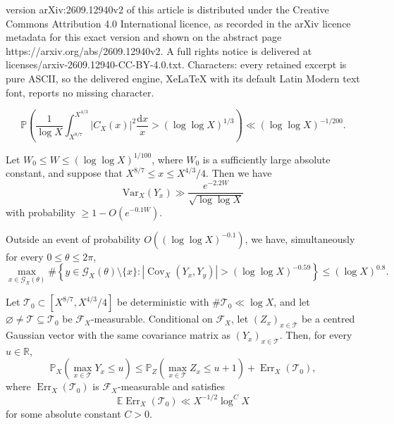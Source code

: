 \documentclass[10pt,a4paper]{amsart}
\newcommand{\E}{\mathbb{E}}
\newcommand{\R}{\mathbb{R}}
\newcommand{\cov}{\operatorname{Cov}}
\newcommand{\p}{\mathbb{P}}
\begin{document}
version arXiv:2609.12940v2 of this article is distributed under the Creative Commons Attribution 4.0 International licence, as recorded in the arXiv licence metadata for this exact version and shown on the abstract page https://arxiv.org/abs/2609.12940v2. A full rights notice is delivered at licenses/arxiv-2609.12940-CC-BY-4.0.txt. Characters: every retained excerpt is pure ASCII, so the delivered engine, XeLaTeX with its default Latin Modern text font, reports no missing character.
\begin{proposition}
\label{prop:old-prime-energy}
\begin{equation}\label{eq:old-prime-energy}
 \p\left(\frac1{\log X}\int_{X^{8/7}}^{X^{4/3}}
 |C_X(x)|^2\frac{\mathrm{d}x}{x}>(\log\log X)^{1/3}\right)
 \ll (\log\log X)^{-1/200}.
\end{equation}
\end{proposition}

\begin{proposition}
\label{prop:B-variance}
Let $W_0\leq W\leq(\log\log X)^{1/100}$, where $W_0$ is a
sufficiently large absolute constant, and suppose that
$X^{8/7}\leq x\leq X^{4/3}/4$. Then we have %
\begin{equation}\label{eq:B-variance-lower}
 \mathrm{Var}_X(Y_x)
 \gg \frac{e^{-2.2W}}{\sqrt{\log\log X}}
\end{equation}
with  probability $\ge1-O(e^{-0.1W})$.
\end{proposition}

\begin{proposition}
\label{prop:weighted-covariance}
Outside an event of probability $O((\log\log X)^{-0.1})$, we have,
simultaneously for every $0\leq\theta\leq2\pi$,
\[
 \max_{x\in{\mathcal G}_X(\theta)}
 \#\left\{y\in{\mathcal G}_X(\theta)\setminus\{x\}:
 |\cov_X(Y_x,Y_y)|>(\log\log X)^{-0.59}\right\}
 \leq(\log X)^{0.8}.
\]
\end{proposition}

\begin{lemma}
\label{lem:conditional-stein}
Let
\(
\mathcal T_0\subset[X^{8/7},X^{4/3}/4]
\)
be deterministic with
\(\#\mathcal T_0\ll\log X\), and let
\(\varnothing\ne\mathcal T\subseteq\mathcal T_0\) be
\(\mathscr F_X\)-measurable.
Conditional on \(\mathscr F_X\), let
\((Z_x)_{x\in\mathcal T}\) be a centred Gaussian vector with the same
covariance matrix as \((Y_x)_{x\in\mathcal T}\).
Then, for every \(u\in\R\),
\begin{equation}\label{eq:stein-max}
 \p_X\left(\max_{x\in\mathcal T}Y_x\leq u\right)
 \leq
 \p_Z\left(\max_{x\in\mathcal T}Z_x\leq u+1\right)
 +\operatorname{Err}_X(\mathcal T_0),
\end{equation}
where \(\operatorname{Err}_X(\mathcal T_0)\) is
\(\mathscr F_X\)-measurable and satisfies
\begin{equation}\label{eq:stein-error-mean}
 \E\operatorname{Err}_X(\mathcal T_0)
 \ll X^{-1/2}\log^C X
\end{equation}
for some absolute constant \(C>0\).
\end{lemma}
\end{document}
